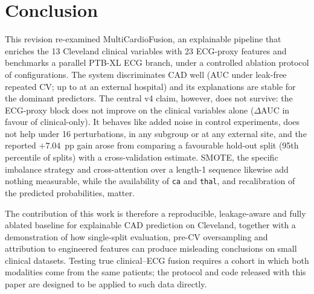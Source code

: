 \section{Conclusion}
This revision re-examined MultiCardioFusion, an explainable pipeline that enriches the 13 Cleveland clinical variables with 23 ECG-proxy features and benchmarks a parallel PTB-XL ECG branch, under a controlled ablation protocol of \nVariants{} configurations. The system discriminates CAD well (AUC \fullAUC{} \fullAUCci{} under leak-free repeated CV; up to \extHunFu{} at an external hospital) and its explanations are stable for the dominant predictors. The central v4 claim, however, does not survive: the ECG-proxy block does not improve on the clinical variables alone ($\Delta$AUC \dClinAUC{} in favour of clinical-only). It behaves like added noise in control experiments, does not help under 16 perturbations, in any subgroup or at any external site, and the reported $+7.04$~pp gain arose from comparing a favourable hold-out split (95th percentile of \hoN{} splits) with a cross-validation estimate. SMOTE, the specific imbalance strategy and cross-attention over a length-1 sequence likewise add nothing measurable, while the availability of \texttt{ca} and \texttt{thal}, and recalibration of the predicted probabilities, matter.

The contribution of this work is therefore a reproducible, leakage-aware and fully ablated baseline for explainable CAD prediction on Cleveland, together with a demonstration of how single-split evaluation, pre-CV oversampling and attribution to engineered features can produce misleading conclusions on small clinical datasets. Testing true clinical--ECG fusion requires a cohort in which both modalities come from the same patients; the protocol and code released with this paper are designed to be applied to such data directly.
